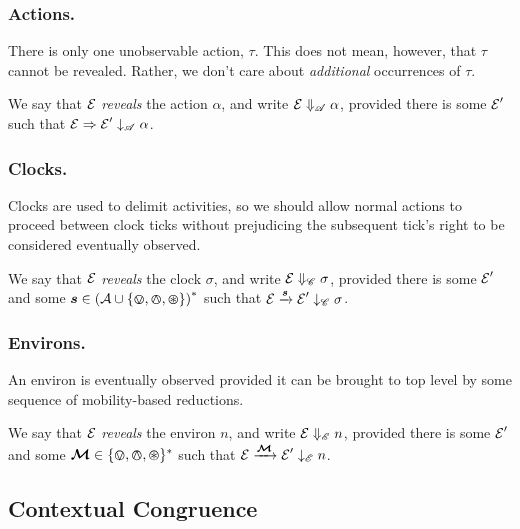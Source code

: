 \documentclass[orivec,envcountsame]{llncs}
\newcommand{\Exhibits}[1]{\mathrel{\downarrow_{#1}}}
\newcommand{\ExhibitsA}{\Exhibits{\mathscr{A}}}
\newcommand{\ExhibitsC}{\Exhibits{\mathscr{C}}}
\newcommand{\ExhibitsE}{\Exhibits{\mathscr{E}}}
\newcommand{\Reveals}[1]{\mathrel{\Downarrow_{#1}}}
\newcommand{\RevealsA}{\Reveals{\mathscr{A}}}
\newcommand{\RevealsC}{\Reveals{\mathscr{C}}}
\newcommand{\RevealsE}{\Reveals{\mathscr{E}}}
\newcommand{\Does}[1]{\xderives{#1}}
\newcommand{\DoesTaus}{\mathrel{\Rightarrow}}
\begin{document}
\subsubsection{Actions.}

There is only one unobservable action, $\tau$. This does not mean,
however, that $\tau$ cannot be revealed. Rather, we don't care about
\emph{additional} occurrences of $\tau$.

\begin{definition}
We say that $\text{$\mathcal{E}$}$ \emph{reveals} the action $\alpha$, and write $\expr
\RevealsA \alpha$, provided there is some $\text{$\mathcal{E}$}'$ such that $\expr
\DoesTaus \expr' \ExhibitsA \alpha$.
\end{definition}

\subsubsection{Clocks.}

Clocks are used to delimit activities, so we should allow normal actions
to proceed between clock ticks without prejudicing the subsequent tick's
right to be considered eventually observed.

\begin{definition}
We say that $\text{$\mathcal{E}$}$ \emph{reveals} the clock $\sigma$, and write $\expr
\RevealsC \sigma$, provided there is some $\text{$\mathcal{E}$}'$ and some $\vec{s} \in
\left( \act \cup \{ \tin, \tout, \topen \}\right)^*$ such that $\expr
\Does{\vec{s}} \expr' \ExhibitsC \sigma$.
\end{definition}


\subsubsection{Environs.}

An environ is eventually observed provided it can be brought to top
level by some sequence of mobility-based reductions.

\begin{definition}
We say that $\text{$\mathcal{E}$}$ \emph{reveals} the environ $n$, and write $\expr
\RevealsE n$, provided there is some $\text{$\mathcal{E}$}'$ and some $\vec{\ambop} \in
\{\tin, \tout, \topen\}^*$ such that $\expr \Does{\vec{\ambop}} \expr'
\ExhibitsE n$.
\end{definition}



\subsection{Contextual Congruence}
\label{sec:contextual-congruence}
\end{document}
